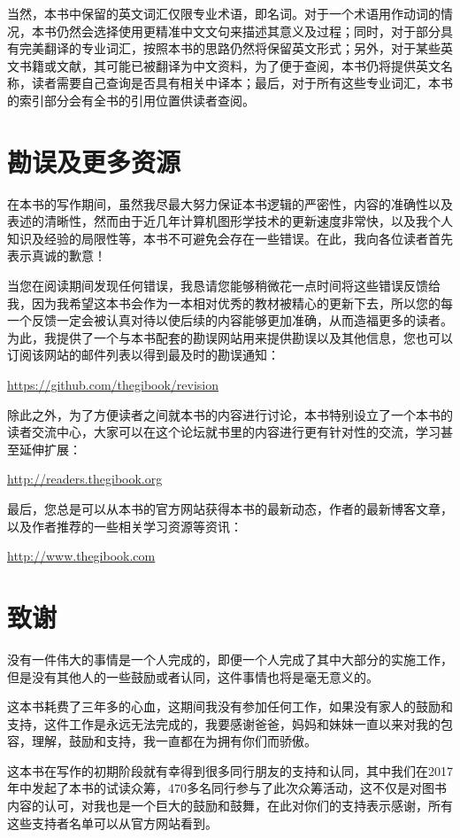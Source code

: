 当然，本书中保留的英文词汇仅限专业术语，即名词。对于一个术语用作动词的情况，本书仍然会选择使用更精准中文文句来描述其意义及过程；同时，对于部分具有完美翻译的专业词汇，按照本书的思路仍然将保留英文形式；另外，对于某些英文书籍或文献，其可能已被翻译为中文资料，为了便于查阅，本书仍将提供英文名称，读者需要自己查询是否具有相关中译本；最后，对于所有这些专业词汇，本书的索引部分会有全书的引用位置供读者查阅。



\section*{勘误及更多资源}
在本书的写作期间，虽然我尽最大努力保证本书逻辑的严密性，内容的准确性以及表述的清晰性，然而由于近几年计算机图形学技术的更新速度非常快，以及我个人知识及经验的局限性等，本书不可避免会存在一些错误。在此，我向各位读者首先表示真诚的歉意！

当您在阅读期间发现任何错误，我恳请您能够稍微花一点时间将这些错误反馈给我，因为我希望这本书会作为一本相对优秀的教材被精心的更新下去，所以您的每一个反馈一定会被认真对待以使后续的内容能够更加准确，从而造福更多的读者。为此，我提供了一个与本书配套的勘误网站用来提供勘误以及其他信息，您也可以订阅该网站的邮件列表以得到最及时的勘误通知：

\url{https://github.com/thegibook/revision}

除此之外，为了方便读者之间就本书的内容进行讨论，本书特别设立了一个本书的读者交流中心，大家可以在这个论坛就书里的内容进行更有针对性的交流，学习甚至延伸扩展：

\url{http://readers.thegibook.org}

最后，您总是可以从本书的官方网站获得本书的最新动态，作者的最新博客文章，以及作者推荐的一些相关学习资源等资讯：

\url{http://www.thegibook.com}




\section*{致谢}
没有一件伟大的事情是一个人完成的，即便一个人完成了其中大部分的实施工作，但是没有其他人的一些鼓励或者认同，这件事情也将是毫无意义的。

这本书耗费了三年多的心血，这期间我没有参加任何工作，如果没有家人的鼓励和支持，这件工作是永远无法完成的，我要感谢爸爸，妈妈和妹妹一直以来对我的包容，理解，鼓励和支持，我一直都在为拥有你们而骄傲。

这本书在写作的初期阶段就有幸得到很多同行朋友的支持和认同，其中我们在2017年中发起了本书的试读众筹，470多名同行参与了此次众筹活动，这不仅是对图书内容的认可，对我也是一个巨大的鼓励和鼓舞，在此对你们的支持表示感谢，所有这些支持者名单可以从官方网站看到。

